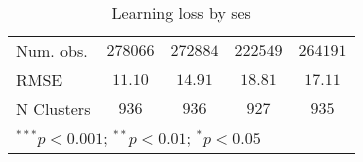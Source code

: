 \begin{table}
\begin{center}
\begin{tabular}{l c c c c}
Num. obs.                   & $278066$      & $272884$      & $222549$      & $264191$      \\
RMSE                        & $11.10$       & $14.91$       & $18.81$       & $17.11$       \\
N Clusters                  & $936$         & $936$         & $927$         & $935$         \\
\hline
\multicolumn{5}{l}{\scriptsize{$^{***}p<0.001$; $^{**}p<0.01$; $^{*}p<0.05$}}
\end{tabular}
\caption{Learning loss by ses}
\label{tableses}
\end{center}
\end{table}
